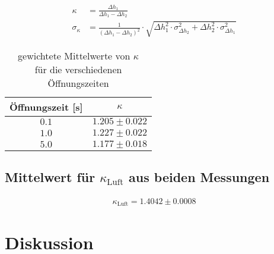 \documentclass[12pt,a4paper,titlepage,headinclude,bibtotoc]{scrartcl}
\begin{document}
\begin{align}
	\kappa&=\frac{\Delta h_{1}}{\Delta h_{1} - \Delta h_{2}}\\
	\sigma_{\kappa}&=\frac{1}{\left(\Delta h_{1} - \Delta h_{2}\right)^{2}} \cdot \sqrt{\Delta h_{1}^{2} \cdot \sigma_{\Delta h_2}^{2} + \Delta h_{2}^{2} \cdot \sigma_{\Delta h_1}^{2}}
\end{align}

\begin{table}[!htb]
	\centering
	\begin{tabular}{|c|c|}
		\hline
		Öffnungszeit [s] & $\kappa$\\
		\hline
		$ 0.1 $ & $ 1.205 \pm 0.022 $ \\
		$ 1.0 $ & $ 1.227 \pm 0.022 $ \\
		$ 5.0 $ & $ 1.177 \pm 0.018 $ \\
		\hline
	\end{tabular}
	\caption{gewichtete Mittelwerte von $\kappa$ \\ für die verschiedenen Öffnungszeiten}
\end{table}

\subsection{Mittelwert für $\kappa_\text{Luft}$ aus beiden Messungen}
\begin{align}
	\kappa_\text{Luft}=1.4042 \pm 0.0008
\end{align}

\section{Diskussion}
\label{sec:diskussion}
\end{document}
